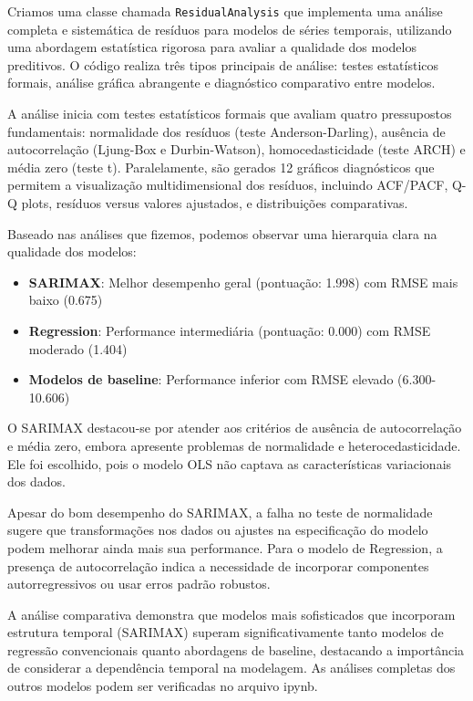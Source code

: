 \documentclass{article}
\begin{document}
Criamos uma classe chamada \texttt{ResidualAnalysis} que implementa uma análise completa e sistemática de resíduos para modelos de séries temporais, utilizando uma abordagem estatística rigorosa para avaliar a qualidade dos modelos preditivos. O código realiza três tipos principais de análise: testes estatísticos formais, análise gráfica abrangente e diagnóstico comparativo entre modelos.

A análise inicia com testes estatísticos formais que avaliam quatro pressupostos fundamentais: normalidade dos resíduos (teste Anderson-Darling), ausência de autocorrelação (Ljung-Box e Durbin-Watson), homocedasticidade (teste ARCH) e média zero (teste t). Paralelamente, são gerados 12 gráficos diagnósticos que permitem a visualização multidimensional dos resíduos, incluindo ACF/PACF, Q-Q plots, resíduos versus valores ajustados, e distribuições comparativas.

Baseado nas análises que fizemos, podemos observar uma hierarquia clara na qualidade dos modelos:

\begin{itemize}
    \item \textbf{SARIMAX}: Melhor desempenho geral (pontuação: 1.998) com RMSE mais baixo (0.675)
    \item \textbf{Regression}: Performance intermediária (pontuação: 0.000) com RMSE moderado (1.404)
    \item \textbf{Modelos de baseline}: Performance inferior com RMSE elevado (6.300-10.606)
\end{itemize}

O SARIMAX destacou-se por atender aos critérios de ausência de autocorrelação e média zero, embora apresente problemas de normalidade e heterocedasticidade. Ele foi escolhido, pois o modelo OLS não captava as características variacionais dos dados.

Apesar do bom desempenho do SARIMAX, a falha no teste de normalidade sugere que transformações nos dados ou ajustes na especificação do modelo podem melhorar ainda mais sua performance. Para o modelo de Regression, a presença de autocorrelação indica a necessidade de incorporar componentes autorregressivos ou usar erros padrão robustos.

A análise comparativa demonstra que modelos mais sofisticados que incorporam estrutura temporal (SARIMAX) superam significativamente tanto modelos de regressão convencionais quanto abordagens de baseline, destacando a importância de considerar a dependência temporal na modelagem. As análises completas dos outros modelos podem ser verificadas no arquivo ipynb.
\end{document}
